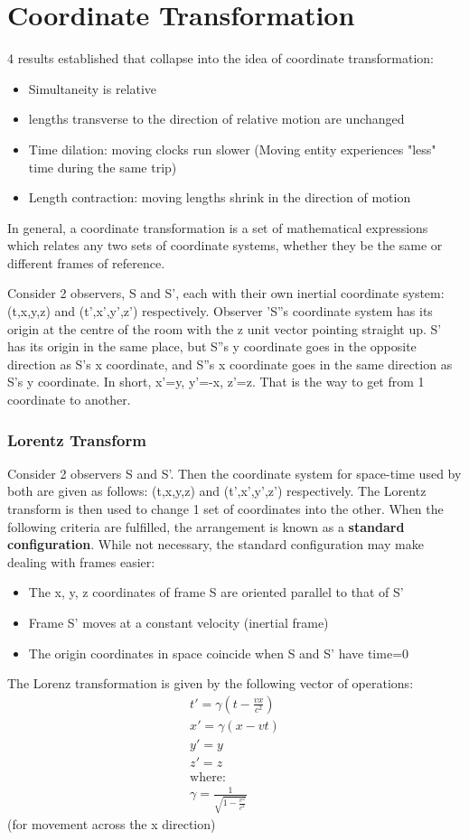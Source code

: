 \documentclass[10pt]{report}
\begin{document}
{\section{Coordinate Transformation}
\par{ 4 results established that collapse into the idea of coordinate transformation:
	\begin{itemize}
		\item{Simultaneity is relative}
		\item{lengths transverse to the direction of relative motion are unchanged}
		\item{Time dilation: moving clocks run slower (Moving entity experiences "less" time during the same trip)}
		\item{Length contraction: moving lengths shrink in the direction of motion}
	\end{itemize}
In general, a coordinate transformation is a set of mathematical expressions which relates any two sets of coordinate systems, whether they be the same or different frames of reference. }
\par{Consider 2 observers, S and S', each with their own inertial coordinate system:(t,x,y,z) and (t',x',y',z') respectively. Observer 'S''s coordinate system has its origin at the centre of the room with the z unit vector pointing straight up. S' has its origin in the same place, but S''s y coordinate goes in the opposite direction as S's x coordinate, and S''s x coordinate goes in the same direction as S's y coordinate. In short, x'=y, y'=-x, z'=z. That is the way to get from 1 coordinate to another.}
\subsubsection{Lorentz Transform}
\par{Consider 2 observers S and S'. Then the coordinate system for space-time used by both are given as follows: (t,x,y,z) and (t',x',y',z') respectively. The Lorentz transform is then used to change 1 set of coordinates into the other. When the following criteria are fulfilled, the arrangement is known as a \textbf{standard configuration}. While not necessary, the standard configuration may make dealing with frames easier:
	\begin{itemize}
		\item{The x, y, z coordinates of frame S are oriented parallel to that of S'}
		\item{Frame S' moves at a constant velocity (inertial frame)}
		\item{The origin coordinates in space coincide when S and S' have time=0}
	\end{itemize}
The Lorenz transformation is given by the following vector of operations:
\begin{align*}
	t'=\gamma\left(t-\frac{vx}{c^{2}}\right) \\
	x'=\gamma\left(x-vt\right) \\
	y'=y \\
	z'=z \\
	\text{where:} \\
	\gamma=\frac{1}{\sqrt{1-\frac{v^{2}}{c^{2}}}}
\end{align*}
(for movement across the x direction)
}
}
\end{document}
